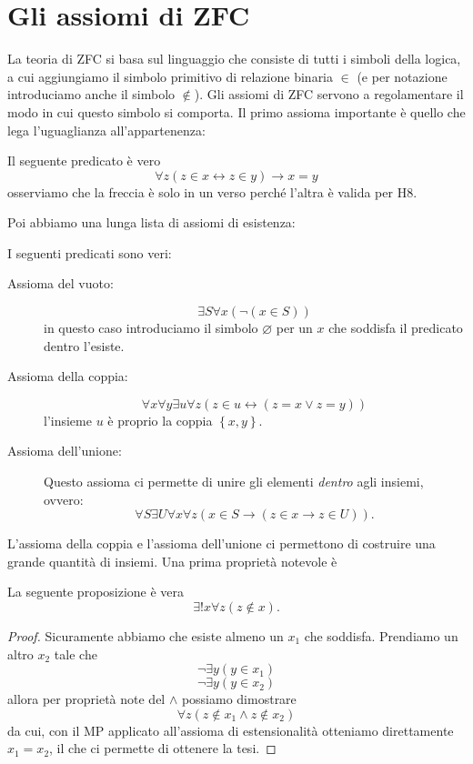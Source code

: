 \documentclass[11pt]{scrartcl}
\begin{document}
	\newpage

	\section{Gli assiomi di ZFC}
	La teoria di ZFC si basa sul linguaggio che consiste di tutti i simboli della logica, a cui aggiungiamo il simbolo primitivo di relazione binaria $\in$ (e per notazione introduciamo anche il simbolo $\not\in$). Gli assiomi di ZFC servono a regolamentare il modo in cui questo simbolo si comporta.
	Il primo assioma importante è quello che lega l'uguaglianza all'appartenenza:
	\begin{definition}
		Il seguente predicato è vero
		$$\forall z \left(z\in x \leftrightarrow z\in y\right)\to x=y$$
		osserviamo che la freccia è solo in un verso perché l'altra è valida per H8.
	\end{definition}
	Poi abbiamo una lunga lista di assiomi di esistenza:
	\begin{definition}
		I seguenti predicati sono veri:
		\begin{description}
			\item[Assioma del vuoto:] $$\exists S \forall x\left(\lnot \left(x\in S\right)\right)$$
			in questo caso introduciamo il simbolo $\varnothing$ per un $x$ che soddisfa il predicato dentro l'esiste.
			\item[Assioma della coppia:] $$\forall x \forall y \exists u \forall z \left(z\in u \leftrightarrow \left(z=x \lor z=y\right)\right)$$
			l'insieme $u$ è proprio la coppia $\left\{x,y\right\}$.
			\item[Assioma dell'unione:] Questo assioma ci permette di unire gli elementi \textit{dentro} agli insiemi, ovvero:
			$$\forall S\exists U\forall x \forall z\left(x\in S\to \left(z\in x \to z\in U\right)\right).$$
		\end{description}
	\end{definition}
	L'assioma della coppia e l'assioma dell'unione ci permettono di costruire una grande quantità di insiemi. Una prima proprietà notevole è
	\begin{proposition}
		La seguente proposizione è vera
		$$\exists ! x \forall z\left(z\not\in x\right).$$
	\end{proposition}
	\begin{proof}
		Sicuramente abbiamo che esiste almeno un $x_1$ che soddisfa. Prendiamo un altro $x_2$ tale che
		$$\lnot \exists y\left(y\in x_1\right)$$
		$$\lnot \exists y\left(y\in x_2\right)$$
		allora per proprietà note del $\land$ possiamo dimostrare
		$$\forall z\left(z\not \in x_1 \land z \not \in x_2\right)$$
		da cui, con il MP applicato all'assioma di estensionalità otteniamo direttamente $x_1=x_2$, il che ci permette di ottenere la tesi.
	\end{proof}
\end{document}
